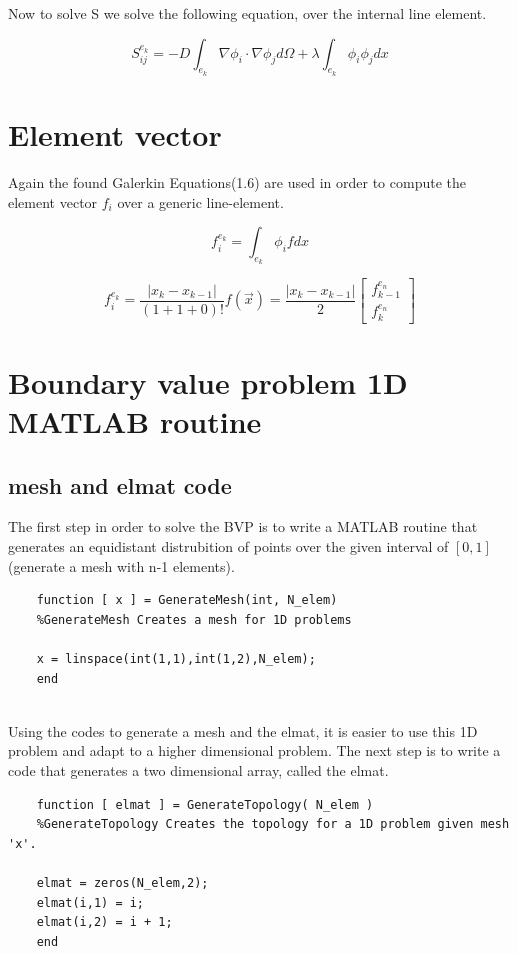 \documentclass[a4paper]{report}
\begin{document}
Now to solve S we solve the following equation, over the internal line element.

\begin{equation}
S^{e_k}_{ij} = -D\int_{e_k}\nabla\phi_i\cdot\nabla\phi_j d\Omega+\lambda\int_{e_k}\phi_i\phi_j dx
\end{equation}


\section{Element vector}\label{Element_vector}
Again the found Galerkin Equations(1.6) are used in order to compute the element vector $f_i$ over a generic line-element.

\begin{equation}
f^{e_k}_i = \int_{e_k}\phi_i f dx
\end{equation}

\begin{equation}
	f^{e_k}_i =\frac{\lvert x_k-x_{k-1}\lvert}{(1+1+0)!}f(\vec{x}) =\frac{\lvert x_k-x_{k-1}\lvert}{2}
	\begin{bmatrix} f^{e_n}_{k-1}\\ f^{e_n}_{k}
	\end{bmatrix}
\end{equation}







\section{Boundary value problem 1D MATLAB routine}

\subsection{mesh and elmat code}
The first step in order to solve the BVP is to write a MATLAB routine that generates an equidistant distrubition of points over the given interval of $[0,1]$(generate a mesh with n-1 elements).

\begin{lstlisting}
	function [ x ] = GenerateMesh(int, N_elem)
	%GenerateMesh Creates a mesh for 1D problems
	
	x = linspace(int(1,1),int(1,2),N_elem);
	end
	
\end{lstlisting}
	
Using the codes to generate a mesh and the elmat, it is easier to use this 1D problem and adapt to a higher dimensional problem. The next step is to write a code that generates a two dimensional array, called the elmat.
\newpage
\begin{lstlisting}
	function [ elmat ] = GenerateTopology( N_elem )
	%GenerateTopology Creates the topology for a 1D problem given mesh 'x'.
	
	elmat = zeros(N_elem,2);
	elmat(i,1) = i;
	elmat(i,2) = i + 1;
	end

\end{lstlisting}
\end{document}
